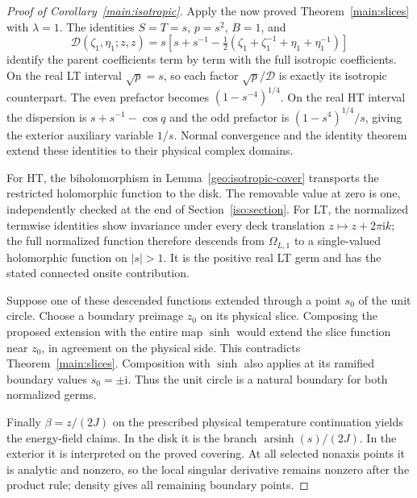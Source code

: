 \documentclass[11pt]{article}
\numberwithin{equation}{section}
\theoremstyle{definition}
\newcommand{\ii}{\mathrm i}
\begin{document}
\begin{proof}[Proof of Corollary~\ref{main:isotropic}]
Apply the now proved Theorem~\ref{main:slices} with \(\lambda=1\).
The identities \(S=T=s\), \(p=s^2\), \(B=1\), and
\[
 \mathcal D(\zeta_1,\eta_1;z,z)
 =s\left[s+s^{-1}
 -\tfrac12(\zeta_1+\zeta_1^{-1}+\eta_1+\eta_1^{-1})\right]
\]
identify the parent coefficients term by term with the full isotropic
coefficients. On the real LT interval \(\sqrt p=s\), so each
factor \(\sqrt p/\mathcal D\) is exactly its isotropic counterpart.
The even prefactor becomes \((1-s^{-4})^{1/4}\). On the real HT
interval the dispersion is \(s+s^{-1}-\cos q\) and the odd
prefactor is \((1-s^4)^{1/4}/s\), giving the exterior auxiliary
variable \(1/s\). Normal convergence and the identity theorem
extend these identities to their physical complex domains.

For HT, the biholomorphism in Lemma~\ref{geo:isotropic-cover}
transports the restricted holomorphic function to the disk. The
removable value at zero is one, independently checked at the end
of Section~\ref{iso:section}. For LT, the normalized termwise
identities show invariance under every deck translation
\(z\mapsto z+2\pi\ii k\); the full normalized function therefore
descends from \(\Omega_{L,1}\) to a single-valued holomorphic
function on \(|s|>1\). It is the positive real LT germ and has
the stated connected onsite contribution.

Suppose one of these descended functions extended through a point
\(s_0\) of the unit circle. Choose a boundary preimage \(z_0\)
on its physical slice. Composing the proposed extension with the
entire map \(\sinh\) would extend the slice function near
\(z_0\), in agreement on the physical side. This contradicts
Theorem~\ref{main:slices}. Composition with \(\sinh\) also applies at
its ramified boundary values \(s_0=\pm\ii\). Thus the unit circle is
a natural boundary for both normalized germs.

Finally \(\beta=z/(2J)\) on the prescribed physical temperature
continuation yields the energy-field claims. In the disk it is
the branch \(\operatorname{arsinh}(s)/(2J)\). In the exterior it
is interpreted on the proved covering. At all selected nonaxis
points it is analytic and nonzero, so the local singular
derivative remains nonzero after the product rule; density gives
all remaining boundary points.
\end{proof}
\end{document}
